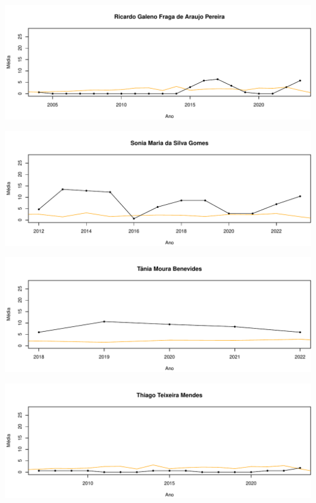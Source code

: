 \documentclass[12pt,brazil]{article}\usepackage[]{graphicx}\usepackage[]{xcolor}
\makeatletter
\def\maxwidth{ %
  \ifdim\Gin@nat@width>\linewidth
    \linewidth
  \else
    \Gin@nat@width
  \fi
}
\makeatother
\begin{document}
\vspace{0.5cm}


{\centering \includegraphics[width=\maxwidth]{figure/mediamovel-38} 

}



\vspace{0.5cm}


{\centering \includegraphics[width=\maxwidth]{figure/mediamovel-39} 

}



\vspace{0.5cm}


{\centering \includegraphics[width=\maxwidth]{figure/mediamovel-40} 

}



\vspace{0.5cm}


{\centering \includegraphics[width=\maxwidth]{figure/mediamovel-41} 

}
\end{document}
